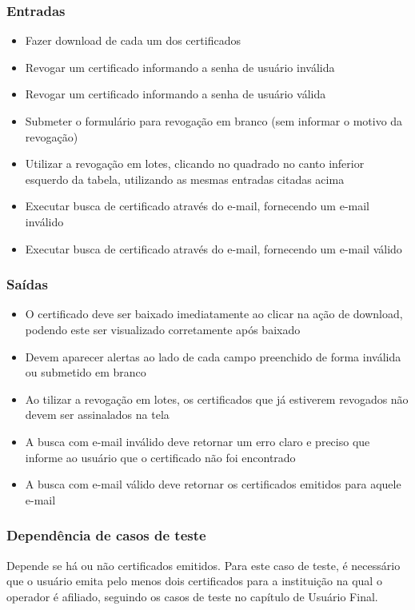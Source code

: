 \subsubsection{Entradas}
\begin{itemize}

	\item Fazer download de cada um dos certificados 
	\item Revogar um certificado informando a senha de usuário inválida
	\item Revogar um certificado informando a senha de usuário válida
	\item Submeter o formulário para revogação em branco (sem informar o motivo da revogação)
	\item Utilizar a revogação em lotes, clicando no quadrado no canto inferior esquerdo da tabela, utilizando as mesmas entradas citadas acima
	\item Executar busca de certificado através do e-mail, fornecendo um e-mail inválido
	\item Executar busca de certificado através do e-mail, fornecendo um e-mail válido
	
\end{itemize}

\subsubsection{Saídas}

\begin{itemize}

	\item O certificado deve ser baixado imediatamente ao clicar na ação de download, podendo este ser visualizado corretamente após baixado
	\item Devem aparecer alertas ao lado de cada campo preenchido de forma inválida ou submetido em branco
	\item Ao tilizar a revogação em lotes, os certificados que já estiverem revogados não devem ser assinalados na tela
	\item A busca com e-mail inválido deve retornar um erro claro e preciso que informe ao usuário que o certificado não foi encontrado
	\item A busca com e-mail válido deve retornar os certificados emitidos para aquele e-mail
	
\end{itemize}

\subsubsection{Dependência de casos de teste}
Depende se há ou não certificados emitidos. Para este caso de teste, é necessário que o usuário emita pelo menos dois certificados para a instituição na qual o operador é afiliado, seguindo os casos de teste no capítulo de Usuário Final.

